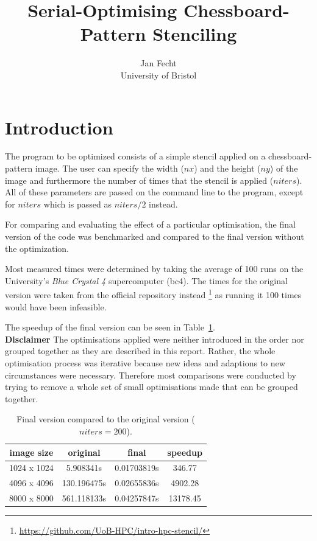 \documentclass[letterpaper,twocolumn,10pt]{article}
\begin{document}

\date{}

\title{Serial-Optimising Chessboard-Pattern Stenciling}

\author{
  {\rm Jan Fecht}\\
  University of Bristol}

\maketitle


\section*{Introduction}
The program to be optimized consists of a simple stencil applied on a chessboard-pattern image.
The user can specify the width ($nx$) and the height ($ny$) of the image and furthermore
the number of times that the stencil is applied ($niters$). All of these parameters are passed on the command line to the program, except for $niters$ which is passed as $niters/2$ instead.

For comparing and evaluating the effect of
a particular optimisation, the final version of the code was benchmarked
and compared to the final version without the optimization.

Most measured times were determined by taking the average of 100 runs
on the University's \textit{Blue Crystal 4} supercomputer (bc4). The times for
the original version were taken from the official repository instead
\footnote{ \url{https://github.com/UoB-HPC/intro-hpc-stencil/}} as running
it 100 times would have been infeasible.

The speedup of the final version can be seen in Table~\ref{tab:final}.  \\

\textbf{Disclaimer} The optimisations applied were neither introduced
in the order nor grouped together as they are described in this report. Rather, the 
whole optimisation process was iterative because new ideas and adaptions to new
circumstances were necessary. Therefore most comparisons were conducted by trying to remove
a whole set of small optimisations made that can be grouped together.

\begin{table}[ht]
	\caption{Final version compared to the original version ($niters=200$).}
	\begin{tabular}{c c c c}
		 image size & original & final & speedup \\
		 \hline
		1024 x 1024 & 5.908341s   & 0.01703819s & 346.77 \\
		4096 x 4096 & 130.196475s & 0.02655836s & 4902.28\\
		8000 x 8000 & 561.118133s & 0.04257847s & 13178.45\\
	\end{tabular}
	\label{tab:final}
\end{table}
\end{document}

